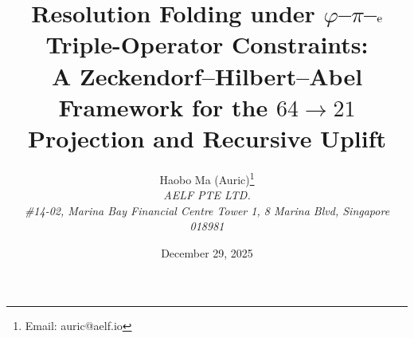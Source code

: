 \documentclass[11pt,a4paper]{article}
\title{Resolution Folding under \texorpdfstring{$\varphi$--$\pi$--$\mathrm{e}$}{phi--pi--e} Triple-Operator Constraints:\\
A Zeckendorf--Hilbert--Abel Framework for the \texorpdfstring{$64\to 21$}{64->21} Projection and Recursive Uplift}
\author{Haobo Ma (Auric)\thanks{Email: auric@aelf.io} \\
\textit{AELF PTE LTD.} \\
\textit{\#14-02, Marina Bay Financial Centre Tower 1, 8 Marina Blvd, Singapore 018981}}
\date{December 29, 2025}
\begin{document}
\maketitle














\FloatBarrier
\appendix


\FloatBarrier

\end{document}
